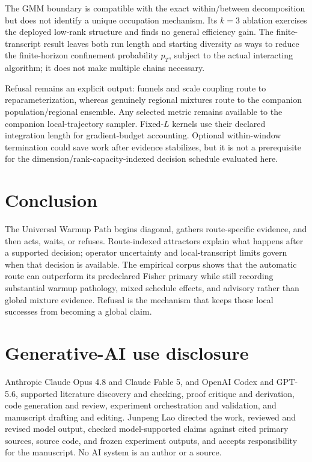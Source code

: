 \documentclass[11pt]{article}
\theoremstyle{plain}
\theoremstyle{definition}
\theoremstyle{remark}
\begin{document}
The GMM boundary is compatible with the exact within/between decomposition but
does not identify a unique occupation mechanism. Its $k=3$ ablation exercises
the deployed low-rank structure and finds no general efficiency gain. The
finite-transcript result leaves both run length and starting diversity as ways
to reduce the finite-horizon confinement probability $p_T$, subject to the
actual interacting algorithm; it does not make multiple chains necessary.

Refusal remains an explicit output: funnels and scale coupling route to
reparameterization, whereas genuinely regional mixtures route to the companion
population/regional ensemble. Any selected metric remains available to the
companion local-trajectory sampler. Fixed-$L$ kernels use their declared
integration length for gradient-budget accounting. Optional within-window
termination could save work after evidence stabilizes, but it is not a
prerequisite for the dimension/rank-capacity-indexed decision schedule evaluated
here.

\section{Conclusion}\label{sec:conclusion}

The Universal Warmup Path begins diagonal, gathers route-specific evidence, and
then acts, waits, or refuses. Route-indexed attractors explain what happens
after a supported decision; operator uncertainty and local-transcript limits
govern when that decision is available. The empirical corpus shows that the
automatic route can outperform its predeclared Fisher primary while still
recording substantial warmup pathology, mixed schedule effects, and advisory
rather than global mixture evidence. Refusal is the mechanism that keeps those
local successes from becoming a global claim.

\section*{Generative-AI use disclosure}

Anthropic Claude Opus 4.8 and Claude Fable 5, and OpenAI Codex and GPT-5.6,
supported literature discovery and checking, proof critique and derivation,
code generation and review, experiment orchestration and validation, and
manuscript drafting and editing. Junpeng Lao directed the work, reviewed and
revised model output, checked model-supported claims against cited primary
sources, source code, and frozen experiment outputs, and accepts responsibility
for the manuscript. No AI system is an author or a source.
\end{document}
